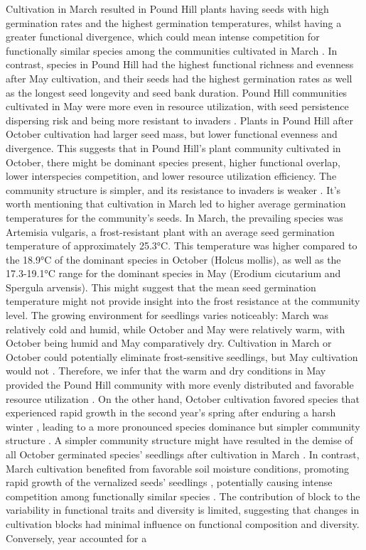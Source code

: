 \documentclass[a4paper, 11, margin=2cm]{article}
\begin{document}
    Cultivation in March resulted in Pound Hill plants having seeds with high germination rates and the highest germination temperatures, whilst having a greater functional divergence, which could mean intense competition for functionally similar species among the communities cultivated in March \citep{mammola2021concepts, jimenez2016seed}. In contrast, species in Pound Hill had the highest functional richness and evenness after May cultivation, and their seeds had the highest germination rates as well as the longest seed longevity and seed bank duration. Pound Hill communities cultivated in May were more even in resource utilization, with seed persistence dispersing risk and being more resistant to invaders \citep{saatkamp2019research, mason2005functional}. Plants in Pound Hill after October cultivation had larger seed mass, but lower functional evenness and divergence. This suggests that in Pound Hill's plant community cultivated in October, there might be dominant species present, higher functional overlap, lower interspecies competition, and lower resource utilization efficiency. The community structure is simpler, and its resistance to invaders is weaker \citep{mammola2021concepts}. It's worth mentioning that cultivation in March led to higher average germination temperatures for the community's seeds. In March, the prevailing species was Artemisia vulgaris, a frost-resistant plant with an average seed germination temperature of approximately 25.3°C. This temperature was higher compared to the 18.9°C of the dominant species in October (Holcus mollis), as well as the 17.3-19.1°C range for the dominant species in May (Erodium cicutarium and Spergula arvensis). This might suggest that the mean seed germination temperature might not provide insight into the frost resistance at the community level. The growing environment for seedlings varies noticeably: March was relatively cold and humid, while October and May were relatively warm, with October being humid and May comparatively dry. Cultivation in March or October could potentially eliminate frost-sensitive seedlings, but May cultivation would not \citep{crawley2021rise}. Therefore, we infer that the warm and dry conditions in May provided the Pound Hill community with more evenly distributed and favorable resource utilization \citep{saatkamp2019research,mason2005functional}. On the other hand, October cultivation favored species that experienced rapid growth in the second year's spring after enduring a harsh winter \citep{crawley2004timing}, leading to a more pronounced species dominance but simpler community structure \citep{mammola2021concepts}. A simpler community structure might have resulted in the demise of all October germinated species' seedlings after cultivation in March \citep{crawley2004timing}. In contrast, March cultivation benefited from favorable soil moisture conditions, promoting rapid growth of the vernalized seeds' seedlings \citep{crawley2004timing}, potentially causing intense competition among functionally similar species \citep{mammola2021concepts,jimenez2016seed}. The contribution of block to the variability in functional traits and diversity is limited, suggesting that changes in cultivation blocks had minimal influence on functional composition and diversity. Conversely, year accounted for a 
\end{document}
